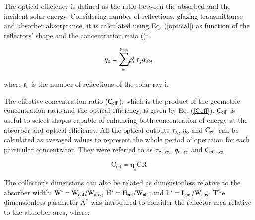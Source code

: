 %
%

The optical efficiency is defined as the ratio between the absorbed and the incident solar energy. Considering number of reflections, glazing transmittance and absorber absorptance, it is calculated using Eq. (\ref{optical}) as function of the reflectors' shape and the concentration ratio (\cite{Sellami2013}):

\vspace{-0.75cm}
\begin{equation}
\mathrm{\eta_o = {\mathlarger{\sum\limits}_{\scriptscriptstyle i=1}^{\scriptscriptstyle \mathrm{N_{rays}}}{{\rho_{r}^{{r_i}}}}}\tau_{g}\alpha_{abs}}
\label{optical}
\end{equation}

\noindent where $\rm{r_i}$ is the number of reflections of the solar ray i.

The effective concentration ratio ($\rm{C_{eff}}$), which is the product of the geometric concentration ratio and the optical efficiency, is given by Eq. (\ref{Ceff}). $\rm{C_{eff}}$ is useful to select shapes capable of enhancing both concentration of energy at the absorber and optical efficiency. All the optical outputs $\tau_{\rm g}$, $\eta_{\rm o}$ and $\rm{C_{eff}}$ can be calculated as averaged values to represent the whole period of operation for each particular concentrator. They were referred to as $\tau_{\rm g,avg}$, $\eta_{\rm o,avg}$ and $\rm{C_{eff,avg}}$.

\vspace{-0.75cm}
\begin{equation}
\mathrm{C_{eff} = \eta_{\!_o}CR}
\label{Ceff}
\end{equation}

The collector's dimensions can also be related as dimensionless relative to the absorber width: $\rm{W^{*} = W_{col}/W_{abs}}$, $\rm{H^{*} = H_{col}/W_{abs}}$ and $\rm{L^{*} = L_{col}/W_{abs}}$. The dimensionless parameter A$^*$ was introduced to consider the reflector area relative to the absorber area, where:

